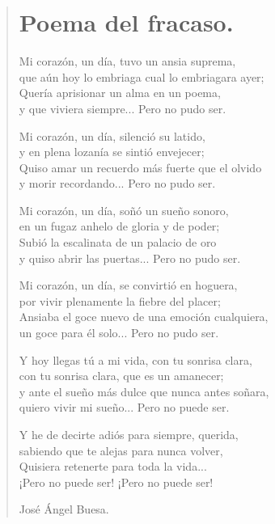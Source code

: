 \documentclass[11pt, portrait, twoside, notitlepage, openright]{book}
\begin{document}
\newpage
\begin{verse}
\begin{center}
\section{Poema del fracaso.}
\end{center}
Mi corazón, un día, tuvo un ansia suprema,\\
que aún hoy lo embriaga cual lo embriagara ayer;\\
Quería aprisionar un alma en un poema,\\
y que viviera siempre... Pero no pudo ser.
\newline

Mi corazón, un día, silenció su latido,\\
y en plena lozanía se sintió envejecer;\\
Quiso amar un recuerdo más fuerte que el olvido\\
y morir recordando... Pero no pudo ser.
\newline

Mi corazón, un día, soñó un sueño sonoro,\\
en un fugaz anhelo de gloria y de poder;\\
Subió la escalinata de un palacio de oro\\
y quiso abrir las puertas... Pero no pudo ser.
\newline

Mi corazón, un día, se convirtió en hoguera,\\
por vivir plenamente la fiebre del placer;\\
Ansiaba el goce nuevo de una emoción cualquiera,\\
un goce para él solo... Pero no pudo ser.
\newline

Y hoy llegas tú a mi vida, con tu sonrisa clara,\\
con tu sonrisa clara, que es un amanecer;\\
y ante el sueño más dulce que nunca antes soñara,\\
quiero vivir mi sueño... Pero no puede ser.
\newpage

Y he de decirte adiós para siempre, querida,\\
sabiendo que te alejas para nunca volver,\\
Quisiera retenerte para toda la vida...\\
¡Pero no puede ser! ¡Pero no puede ser!
\newline

José Ángel Buesa.
\end{verse}
\end{document}

